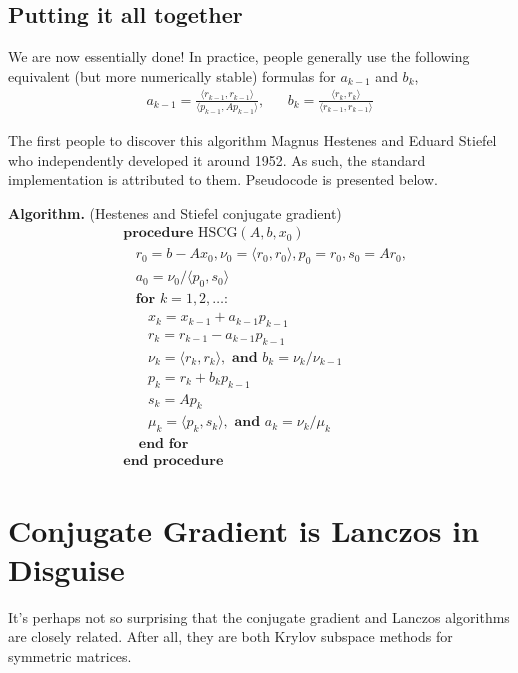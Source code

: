 \documentclass[10pt]{article}
\begin{document}
\subsection{Putting it all together}

We are now essentially done! In practice, people generally use the following equivalent (but more numerically stable) formulas for \(a_{k-1}\) and \(b_k\),
\begin{align*}
a_{k-1} = \frac{\langle r_{k-1},r_{k-1}\rangle}{\langle p_{k-1},Ap_{k-1}\rangle}
,&&
b_k = \frac{\langle r_k,r_k\rangle}{\langle r_{k-1},r_{k-1}\rangle}
\end{align*}

The first people to discover this algorithm Magnus Hestenes and Eduard Stiefel who independently developed it around 1952. As such, the standard implementation is attributed to them.
Pseudocode is presented below.

\textbf{Algorithm.} (Hestenes and Stiefel conjugate gradient)
\begin{align*}
&\textbf{procedure}\text{ HSCG}( A,b,x_0 ) 
\\[-.4em]&~~~~r_0 = b-Ax_0, \nu_0 = \langle r_0,r_0 \rangle, p_0 = r_0, s_0 = Ar_0, 
\\[-.4em]&~~~~a_0 = \nu_0 / \langle p_0,s_0 \rangle
\\[-.4em]&~~~~\textbf{for } k=1,2,\ldots \textbf{:} 
\\[-.4em]&~~~~~~~~x_k = x_{k-1} + a_{k-1} p_{k-1} 
\\[-.4em]&~~~~~~~~r_k = r_{k-1} - a_{k-1} p_{k-1} 
\\[-.4em]&~~~~~~~~\nu_{k} = \langle r_k,r_k \rangle, \textbf{ and } b_k = \nu_k / \nu_{k-1}
\\[-.4em]&~~~~~~~~p_k = r_k + b_k p_{k-1}
\\[-.4em]&~~~~~~~~s_k = A p_k
\\[-.4em]&~~~~~~~~\mu_k = \langle p_k,s_k \rangle, \textbf{ and } a_k = \nu_k / \mu_k
\\[-.4em]&~~~~~\textbf{end for}
\\[-.4em]&\textbf{end procedure}
\end{align*}

\section{Conjugate Gradient is Lanczos in Disguise}

It's perhaps not so surprising that the conjugate gradient and Lanczos algorithms are closely related. After all, they are both Krylov subspace methods for symmetric matrices.
\end{document}

